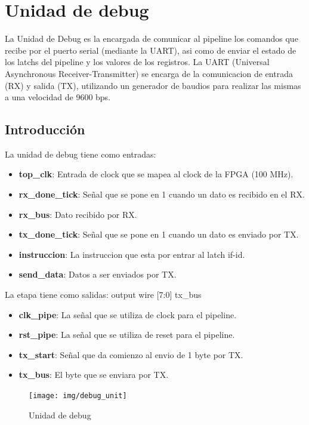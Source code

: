 \section{Unidad de debug}
La Unidad de Debug es la encargada de comunicar al pipeline los comandos que recibe por el puerto serial (mediante la UART), asi como de enviar el estado de los latchs del pipeline y los valores de los registros. La UART (Universal Asynchronous Receiver-Transmitter) se encarga de la comunicacion de entrada (RX) y salida (TX), utilizando un generador de baudios para realizar las mismas a una velocidad de 9600 bps.

\subsection{Introducción}
La unidad de debug tiene como entradas:

\begin{itemize}
  \item \textbf{top\_clk}: Entrada de clock que se mapea al clock de la FPGA (100 MHz). 
  \item \textbf{rx\_done\_tick}: Señal que se pone en 1 cuando un dato es recibido en el RX.
  \item \textbf{rx\_bus}: Dato recibido por RX.
  \item \textbf{tx\_done\_tick}: Señal que se pone en 1 cuando un dato es enviado por TX.
  \item \textbf{instruccion}: La instruccion que esta por entrar al latch if-id.
  \item \textbf{send\_data}: Datos a ser enviados por TX.
\end{itemize} 

La etapa tiene como salidas:
	 output wire [7:0] tx\_bus
\begin{itemize}
	\item \textbf{clk\_pipe}: La señal que se utiliza de clock para el pipeline. 
	\item \textbf{rst\_pipe}: La señal que se utiliza de reset para el pipeline.
	\item \textbf{tx\_start}: Señal que da comienzo al envio de 1 byte por TX. 
	\item \textbf{tx\_bus}: El byte que se enviara por TX.
\end{itemize} 

\begin{figure}[H]
\centering
\texttt{[image: img/debug\_unit]}
\caption{Unidad de debug}
\label{fig:debugunit}
\end{figure}

